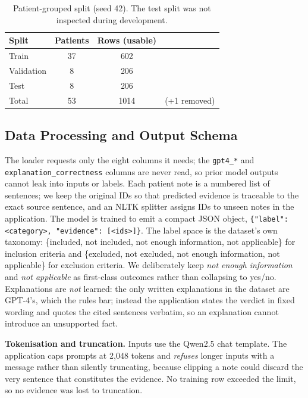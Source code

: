 \documentclass[conference]{IEEEtran}
\begin{document}
\begin{table}[t]
\caption{Patient-grouped split (seed 42). The test split was not inspected
during development.}
\label{tab:split}
\centering
\begin{tabular}{lccc}
\toprule
Split & Patients & Rows (usable) & \\
\midrule
Train      & 37 & 602 & \\
Validation & 8  & 206 & \\
Test       & 8  & 206 & \\
\midrule
Total      & 53 & 1014 & (+1 removed) \\
\bottomrule
\end{tabular}
\end{table}

\subsection{Data Processing and Output Schema}
The loader requests only the eight columns it needs; the
\texttt{gpt4\_*} and \texttt{explanation\_correctness} columns are never read, so
prior model outputs cannot leak into inputs or labels. Each patient note is a
numbered list of sentences; we keep the original IDs so that predicted evidence
is traceable to the exact source sentence, and an NLTK splitter assigns IDs to
unseen notes in the application. The model is trained to emit a compact JSON
object, \texttt{\{"label": <category>, "evidence": [<ids>]\}}. The label space is
the dataset's own taxonomy: \{included, not included, not enough information, not
applicable\} for inclusion criteria and \{excluded, not excluded, not enough
information, not applicable\} for exclusion criteria. We deliberately keep
\emph{not enough information} and \emph{not applicable} as first-class outcomes
rather than collapsing to yes/no. Explanations are \emph{not} learned: the only
written explanations in the dataset are GPT-4's, which the rules bar; instead the
application states the verdict in fixed wording and quotes the cited sentences
verbatim, so an explanation cannot introduce an unsupported fact.

\textbf{Tokenisation and truncation.} Inputs use the Qwen2.5 chat template. The
application caps prompts at 2{,}048 tokens and \emph{refuses} longer inputs with
a message rather than silently truncating, because clipping a note could discard
the very sentence that constitutes the evidence. No training row exceeded the
limit, so no evidence was lost to truncation.
\end{document}
